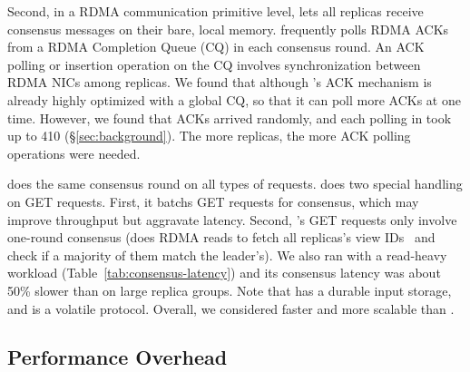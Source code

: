 Second, in a RDMA communication primitive level, \xxx lets all replicas receive 
consensus messages on their bare, local memory. \dare frequently polls 
RDMA ACKs from a RDMA Completion Queue (CQ) in each consensus round. An ACK 
polling or insertion operation on the CQ involves synchronization between 
RDMA NICs among replicas. We found that although \dare's ACK mechanism is 
already highly optimized with a global CQ, so that it can poll more ACKs at 
one time. However, we found that ACKs arrived randomly, and each polling in 
\dare took up to 410 \us (\S\ref{sec:background}). The more replicas, the more 
ACK polling operations were needed.

\xxx does the same consensus round on all types of requests. \dare does two 
special handling on GET requests. First, it batchs GET requests for consensus, 
which may improve throughput but aggravate latency. Second, \dare's GET 
requests only involve one-round consensus (does RDMA reads to fetch all 
replicas's \paxos view IDs~\cite{paxos:practical} and check if a majority of 
them match the leader's). We also ran \dare with a read-heavy workload 
(Table~\ref{tab:consensus-latency}) and its consensus latency was about 50\% 
slower than \xxx on large replica groups. Note that \xxx has a durable input 
storage, and \dare is a volatile protocol. Overall, we considered \xxx faster 
and more scalable than \dare.

% 


\subsection{Performance Overhead} \label{sec:overhead}

